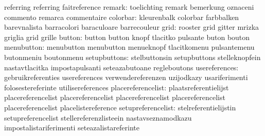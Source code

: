                                   referring                        referring
                                  faitreference
                          remark: toelichting                      remark
                                  bemerkung                        oznaceni
                                  commento                         remarca
                                  commentaire
                        colorbar: kleurenbalk                      colorbar
                                  farbbalken                       barevnalista
                                  barracolori                      baraculoare
                                  barrecouleur
                            grid: rooster                          grid
                                  gitter                           mrizka
                                  griglia                          grid
                                  grille
                          button: button                           button
                                  knopf                            tlacitko
                                  pulsante                         buton
                                  bouton
                      menubutton: menubutton                       menubutton
                                  menueknopf                       tlacitkomenu
                                  pulsantemenu                     butonmeniu
                                  boutonmenu
                    setupbuttons: stelbuttonsin                    setupbuttons
                                  stelleknopfein                   nastavtlacitka
                                  impostapulsanti                  seteazabutoane
                                  regleboutons
                   usereferences: gebruikreferenties               usereferences
                                  verwendereferenzen               uzijodkazy
                                  usariferimenti                   folosestereferinte
                                  utilisereferences
              placereferencelist: plaatsreferentielijst            placereferencelist
                                  placereferencelist               placereferencelist
                                  placereferencelist               placereferencelist
                                  placelistereference
              setupreferencelist: stelreferentielijstin            setupreferencelist
                                  stellereferenzlisteein           nastavseznamodkazu
                                  impostalistariferimenti          seteazalistareferinte
